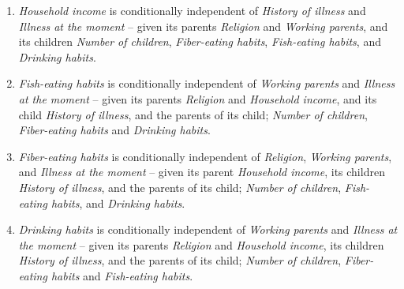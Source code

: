 \begin{enumerate}
\item \textit{Household income} is conditionally independent of \textit{History of illness} and \textit{Illness at the moment} -- given its parents \textit{Religion} and \textit{Working parents}, and its children \textit{Number of children}, \textit{Fiber-eating habits}, \textit{Fish-eating habits}, and \textit{Drinking habits}.

\item \textit{Fish-eating habits} is conditionally independent of \textit{Working parents} and \textit{Illness at the moment} -- given its parents \textit{Religion} and \textit{Household income}, and its child \textit{History of illness}, and the parents of its child; \textit{Number of children}, \textit{Fiber-eating habits} and \textit{Drinking habits}.

\item \textit{Fiber-eating habits} is conditionally independent of \textit{Religion}, \textit{Working parents}, and \textit{Illness at the moment} -- given its parent \textit{Household income}, its children \textit{History of illness}, and the parents of its child; \textit{Number of children}, \textit{Fish-eating habits}, and \textit{Drinking habits}.

\item \textit{Drinking habits} is conditionally independent of \textit{Working parents} and \textit{Illness at the moment} -- given its parents \textit{Religion} and \textit{Household income}, its children \textit{History of illness}, and the parents of its child; \textit{Number of children}, \textit{Fiber-eating habits} and \textit{Fish-eating habits}.

\end{enumerate}



